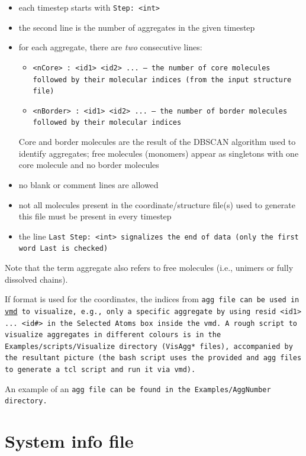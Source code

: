 \begin{itemize}[topsep=0pt,itemsep=0pt]
  \item each timestep starts with \tt{Step: <int>}
  \item the second line is the number of aggregates in the given timestep
  \item for each aggregate, there are \emph{two} consecutive lines:
    \begin{itemize}[topsep=0pt,itemsep=0pt]
      \item \tt{<nCore> : <id1> <id2> ...} --- the number of core molecules
        followed by their molecular indices (from the input structure file)
      \item \tt{<nBorder> : <id1> <id2> ...} --- the number of border molecules
        followed by their molecular indices
    \end{itemize}
    Core and border molecules are the result of the DBSCAN algorithm used to
    identify aggregates; free molecules (monomers) appear as singletons with
    one core molecule and no border molecules
  \item no blank or comment lines are allowed
  \item not all molecules present in the coordinate/structure file(s) used to
    generate this file must be present in every timestep
  \item the line \tt{Last Step: <int>} signalizes the end of data (only the
    first word \tt{Last} is checked)
\end{itemize}

Note that the term aggregate also refers to free molecules (i.e., unimers or
fully dissolved chains).

If \vtf format is used for the coordinates, the indices from \tt{agg} file can
be used in \href{http://www.ks.uiuc.edu/Research/vmd/}{vmd} to visualize, e.g.,
only a specific aggregate by using \tt{resid <id1> ... <id\#>} in the
\tt{Selected Atoms} box inside the vmd. A rough script to visualize aggregates
in different colours is in the \tt{Examples/scripts/Visualize} directory
(\tt{VisAgg*} files),
accompanied by the resultant picture (the bash script uses the
provided \vtf and \tt{agg} files to generate a \tt{tcl} script and run it via
\tt{vmd}).

An example of an \tt{agg} file can be found in the \tt{Examples/AggNumber}
directory. %

\section{System info file} \label{sec:SysInfo} %

